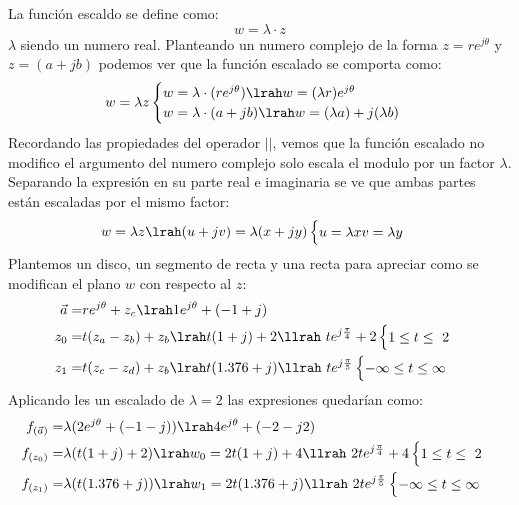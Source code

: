 La función escaldo se define como:
\begin{equation}
    w=\lambda\cdot z
\end{equation}
$\lambda$ siendo un numero real. 
Planteando un numero complejo de la forma $z=re^{j\theta}$ y $z=(a+jb)$ podemos ver que la función escalado se comporta como:
\begin{equation}
    w=\lambda z
    \begin{cases}
        w=\lambda\cdot (re^{j\theta})\lrah w=(\lambda r)e^{j\theta}\\
        w=\lambda\cdot(a+jb)\lrah w=(\lambda a)+j(\lambda b) 
    \end{cases}
\end{equation}
Recordando las propiedades del operador $||$, vemos que la función escalado no modifico el argumento del numero complejo solo escala el modulo por un factor $\lambda$. Separando la expresión en su parte real e imaginaria se ve que ambas partes están escaladas por el mismo factor:
\begin{equation}
    w=\lambda z\lrah (u+jv)=\lambda(x+jy)
    \begin{cases}
        u=\lambda x
        v=\lambda y
    \end{cases}
\end{equation}
Plantemos un disco, un segmento de recta y una recta para apreciar como se modifican el plano $w$ con respecto al $z$:
\begin{equation}
    \begin{aligned}
        \vec{a}=&re^{j\theta}+z_c\lrah 1e^{j\theta}+(-1+j)\\
         z_0=&t(z_a-z_b)+z_b\lrah t(1+j)+2\llrah\ te^{j\frac{\pi}{4}}+2\begin{cases}
            1\leq t\leq\ 2
    \end{cases}\\
        z_1=&t(z_c-z_d)+z_b\lrah t(1.376+j)\llrah\ te^{j\frac{\pi}{5}}\begin{cases}
            -\infty\leq t\leq\infty
    \end{cases}
    \end{aligned}
\end{equation}
Aplicando les un escalado de $\lambda=2$ las expresiones quedarían como:
\begin{equation}
    \begin{aligned}
        f_{(\Vec{a})}=&\lambda (2e^{j\theta}+(-1-j))\lrah 4e^{j\theta}+(-2-j2)\\
        f_{(z_0)}=&\lambda(t(1+j)+2)\lrah w_0=2t(1+j)+4\llrah\ 2te^{j\frac{\pi}{4}}+4\begin{cases}
            1\leq t\leq\ 2
    \end{cases}\\
        f_{(z_1)}=&\lambda(t(1.376+j)) \lrah w_1=2t(1.376+j)\llrah\ 2te^{j\frac{\pi}{5}}\begin{cases}
            -\infty\leq t\leq\infty
    \end{cases}
    \end{aligned}
\end{equation}

